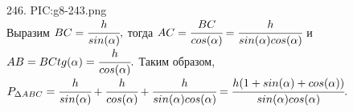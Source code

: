 246. {{PIC:g8-243.png}}\\
Выразим $BC=\cfrac{h}{sin(\alpha)},$ тогда $AC=\cfrac{BC}{cos(\alpha)}=\cfrac{h}{sin(\alpha)cos(\alpha)}$ и $AB=BC tg(\alpha)=\cfrac{h}{cos(\alpha)}.$ Таким образом, $P_{\Delta ABC}=\cfrac{h}{sin(\alpha)}+\cfrac{h}{cos(\alpha)}+\cfrac{h}{sin(\alpha)cos(\alpha)}=
\cfrac{h(1+sin(\alpha)+cos(\alpha))}{sin(\alpha)cos(\alpha)}.$\\
